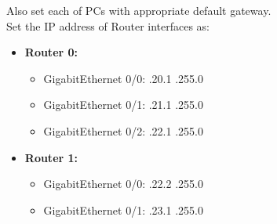 \documentclass[a4paper,11pt]{article}
\begin{document}
\begin{enumerate}
          Also set each of PCs with appropriate default gateway.\\
          Set the IP address of Router interfaces as:
          \begin{itemize}
              \item \textbf{Router 0:}
                    \begin{itemize}
                        \item GigabitEthernet 0/0: \quad {}.20.1 \quad {}.255.0

                        \item GigabitEthernet 0/1: \quad {}.21.1 \quad {}.255.0

                        \item GigabitEthernet 0/2: \quad {}.22.1 \quad {}.255.0\\

                    \end{itemize}


              \item \textbf{Router 1:}
                    \begin{itemize}
                        \item GigabitEthernet 0/0: \quad {}.22.2 \quad {}.255.0

                        \item GigabitEthernet 0/1: \quad {}.23.1 \quad {}.255.0\\

                    \end{itemize}
          \end{itemize}



\end{enumerate}
\end{document}
